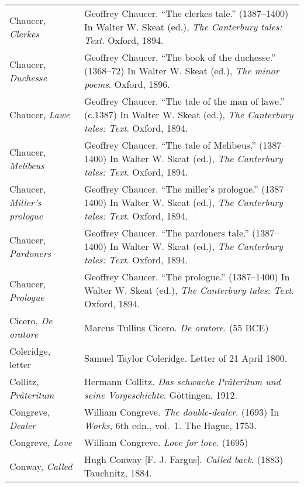 \begin{longtable}{p{} p{}}
Chaucer, \textit{Clerkes} & Geoffrey Chaucer. ``The clerkes tale.'' (1387--1400) In Walter W. Skeat (ed.), \textit{The Canterbury tales: Text}. Oxford, 1894. \\ %
Chaucer, \textit{Duchesse} & Geoffrey Chaucer. ``The book of the duchesse.'' (1368--72) In Walter W. Skeat (ed.), \textit{The minor poems}. Oxford, 1896. \\ %
Chaucer, \textit{Lawe} & Geoffrey Chaucer. ``The tale of the man of lawe.'' (c.1387) In Walter W. Skeat (ed.), \textit{The Canterbury tales: Text}. Oxford, 1894. \\ %
Chaucer, \textit{Melibeus} & Geoffrey Chaucer. ``The tale of Melibeus.'' (1387--1400) In Walter W. Skeat (ed.), \textit{The Canterbury tales: Text}. Oxford, 1894. \\ %
\raggedright{Chaucer, \textit{Miller's prologue}} & Geoffrey Chaucer. ``The miller's prologue.'' (1387--1400) In Walter W. Skeat (ed.), \textit{The Canterbury tales: Text}. Oxford, 1894.  \\ %
Chaucer, \textit{Pardoners} & Geoffrey Chaucer. ``The pardoners tale.'' (1387--1400) In Walter W. Skeat (ed.), \textit{The Canterbury tales: Text}. Oxford, 1894. \\ %
Chaucer, \textit{Prologue} & Geoffrey Chaucer. ``The prologue.'' (1387--1400) In Walter W. Skeat (ed.), \textit{The Canterbury tales: Text}. Oxford, 1894. \\ %

Cicero, \textit{De oratore} & Marcus Tullius Cicero. \textit{De oratore}. (55 BCE)\\

Coleridge, letter & Samuel Taylor Coleridge. Letter of 21 April 1800. \\

Collitz, \textit{Präteritum} & Hermann Collitz. \textit{Das schwache Präteritum und seine Vorgeschichte}. Göttingen, 1912.\\

Congreve, \textit{Dealer} & William Congreve. \textit{The double-dealer}. (1693) In \textit{Works}, 6th edn., vol.~1. The Hague, 1753.\\
Congreve, \textit{Love} & William Congreve. \textit{Love for love}. (1695) \\

Conway, \textit{Called} & Hugh Conway [F. J. Fargus]. \textit{Called back}. (1883) Tauchnitz, 1884.\\ %


\end{longtable}
